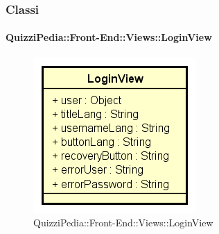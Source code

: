 \subsubsection{Classi}


\paragraph{QuizziPedia::Front-End::Views::LoginView}
\begin{figure} [ht]
	\centering
	\includegraphics[scale=0.80]{UML/Classi/Front-End/QuizziPedia_Front-end_Views_LoginView.png}
	\caption{QuizziPedia::Front-End::Views::LoginView}
\end{figure} \FloatBarrier
